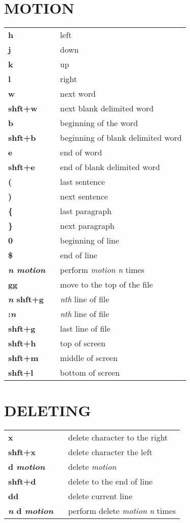 \documentclass[10pt,landscape]{article}
\begin{document}
\begin{multicols*}{3}
\section{MOTION}
\begin{tabular}{@{\hspace{1mm}}ll@{}}
{\bfseries h} &~ left \\
{\bfseries j} &~ down \\
{\bfseries k} &~ up \\
{\bfseries l} &~ right \\
{\bfseries w} &~ next word \\
{\bfseries shft+w} &~ next blank delimited word \\
{\bfseries b} &~ beginning of the word \\
{\bfseries shft+b} &~ beginning of blank delimited word \\
{\bfseries e} &~ end of word \\
{\bfseries shft+e} &~ end of blank delimited word \\
{\bfseries (} &~ last sentence \\
{\bfseries )} &~ next sentence \\
{\bfseries \{} &~ last paragraph \\
{\bfseries \}} &~ next paragraph \\
{\bfseries 0} &~ beginning of line \\
{\bfseries \$} &~ end of line \\
{\bfseries {\em n motion}} &~ perform {\em motion} {\em n} times \\
{\bfseries gg} &~ move to the top of the file \\
{\bfseries {\em n} shft+g} &~ {\em nth} line of file \\
{\bfseries :{\em n}} &~ {\em nth} line of file \\
{\bfseries shft+g} &~ last line of file \\
{\bfseries shft+h} &~ top of screen \\
{\bfseries shft+m} &~ middle of screen \\
{\bfseries shft+l} &~ bottom of screen \\
\end{tabular}


\section{DELETING}
\begin{tabular}{@{\hspace{1mm}}ll@{}}
{\bfseries x} &~ delete character to the right \\
{\bfseries shft+x} &~ delete character the left \\
{\bfseries d {\em motion}} &~ delete {\em motion} \\
{\bfseries shft+d} &~ delete to the end of line \\
{\bfseries dd} &~ delete current line \\
{\bfseries {\em n} d {\em motion}} &~ perform delete {\em motion} {\em n} times \\
\end{tabular}



\end{multicols*}
\end{document}
